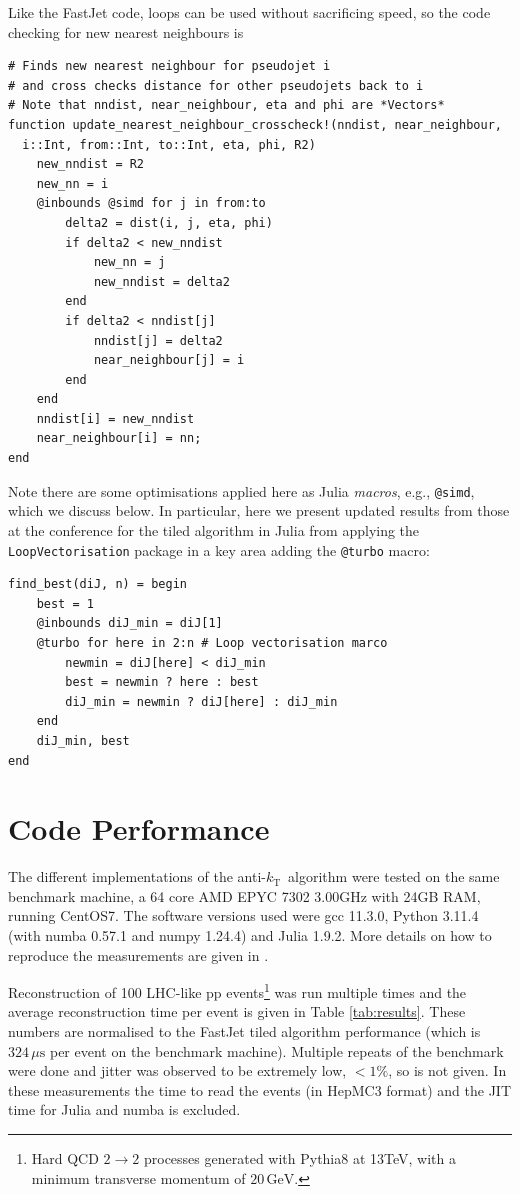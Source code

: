 \documentclass{webofc}
\newcommand{\akt}{anti-${k}_\text{T}$}
\begin{document}
Like the FastJet code, loops can be used without sacrificing speed, so the code checking for new nearest neighbours is

\begin{verbatim}
# Finds new nearest neighbour for pseudojet i 
# and cross checks distance for other pseudojets back to i
# Note that nndist, near_neighbour, eta and phi are *Vectors*
function update_nearest_neighbour_crosscheck!(nndist, near_neighbour,
  i::Int, from::Int, to::Int, eta, phi, R2)
    new_nndist = R2
    new_nn = i
    @inbounds @simd for j in from:to
        delta2 = dist(i, j, eta, phi)
        if delta2 < new_nndist
            new_nn = j
            new_nndist = delta2
        end
        if delta2 < nndist[j]
            nndist[j] = delta2
            near_neighbour[j] = i
        end
    end
    nndist[i] = new_nndist
    near_neighbour[i] = nn;
end
\end{verbatim}

Note there are some optimisations applied here as Julia \emph{macros}, e.g.,
\texttt{@simd}, which we discuss below. In particular, here we present
updated results from those at the conference for the tiled algorithm in
Julia from applying the \texttt{LoopVectorisation} package in a key area adding
the \texttt{@turbo} macro:

\begin{verbatim}
find_best(diJ, n) = begin
    best = 1
    @inbounds diJ_min = diJ[1]
    @turbo for here in 2:n # Loop vectorisation marco
        newmin = diJ[here] < diJ_min
        best = newmin ? here : best
        diJ_min = newmin ? diJ[here] : diJ_min
    end
    diJ_min, best
end
\end{verbatim}

\section{Code Performance}
\label{sec:performance}

The different implementations of the \akt\ algorithm were tested on the
same benchmark machine, a 64 core AMD EPYC 7302 \@ 3.00GHz with 24GB RAM,
running CentOS7. The software versions used were gcc 11.3.0, Python 3.11.4 (with
numba 0.57.1 and numpy 1.24.4) and Julia 1.9.2. More details on how to reproduce
the measurements are given in \cite{polyglot-jets-zenodo}.

Reconstruction of 100 LHC-like pp events\footnote{Hard QCD $2\rightarrow2$ processes
generated with Pythia8 at 13TeV, with a minimum transverse momentum of
$20\,\mathrm{GeV}$.} was run multiple times and the average reconstruction time
per event is given in Table \ref{tab:results}. These numbers are normalised to
the FastJet tiled algorithm performance (which is $324\,\mu \mathrm{s}$ per event
on the benchmark machine). Multiple repeats of the benchmark were done and
jitter was observed to be extremely low, $<1\%$, so is not given. In these
measurements the time to read the events (in HepMC3 format) and the JIT time for
Julia and numba is excluded.
\end{document}
